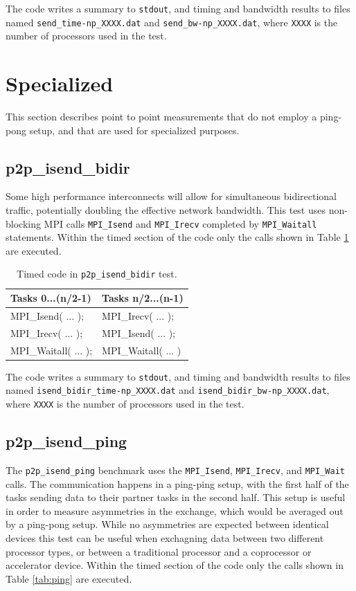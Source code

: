 \documentclass[10pt,a4paper]{report}
\begin{document}
The code writes a summary to \verb+stdout+, and timing and bandwidth results to files named \verb+send_time-np_XXXX.dat+ and \verb+send_bw-np_XXXX.dat+, where \verb+XXXX+ is the number of processors used in the test.

\section{Specialized}
This section describes point to point measurements that do not employ a ping-pong setup, and that are used for specialized purposes.

\FloatBarrier
\subsection{p2p\_isend\_bidir}
Some high performance interconnects will allow for simultaneous bidirectional traffic, potentially doubling the effective network bandwidth. This test uses non-blocking MPI calls \verb+MPI_Isend+ and \verb+MPI_Irecv+ completed by \verb+MPI_Waitall+ statements. 
Within the timed section of the code only the calls shown in Table \ref{tab:bidir} are executed.

\begin{table}[ht]
\centering
\caption{Timed code in \texttt{p2p\_isend\_bidir} test.}
\label{tab:bidir}
\begin{tabular}{|l|l|}
\hline
\bf{Tasks 0...(n/2-1)}	& \bf{Tasks n/2...(n-1)}\\\hline
MPI\_Isend( ... );      & MPI\_Irecv( ... );\\
MPI\_Irecv( ... );      & MPI\_Isend( ... );\\
MPI\_Waitall( ... );    & MPI\_Waitall( ... )\\\hline
\end{tabular}
\end{table}

The code writes a summary to \verb+stdout+, and timing and bandwidth results to files named \verb+isend_bidir_time-np_XXXX.dat+ and \verb+isend_bidir_bw-np_XXXX.dat+, where \verb+XXXX+ is the number of processors used in the test.

\FloatBarrier
\subsection{p2p\_isend\_ping}
The \verb+p2p_isend_ping+ benchmark uses the \verb+MPI_Isend+, \verb+MPI_Irecv+, and \verb+MPI_Wait+ calls. The communication happens in a ping-ping setup, with the first half of the tasks sending data to their partner tasks in the second half. This setup is useful in order to measure asymmetries in the exchange, which would be averaged out by a ping-pong setup. While no asymmetries are expected between identical devices this test can be useful when exchagning data between two different processor types, or between a traditional processor and a coprocessor or accelerator device. Within the timed section of the code only the calls shown in Table \ref{tab:ping} are executed.
\end{document}
